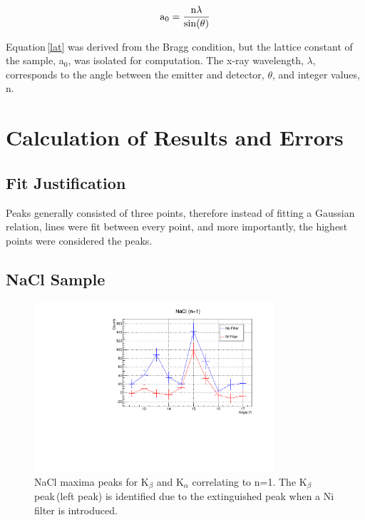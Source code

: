 \documentclass[aps,prl,twocolumn,superscriptaddress,nofootinbib]{revtex4-1}
\begin{document}
\begin{equation}
\textnormal{a$_0$}=\frac{\textnormal{n}\lambda}{\sin(\theta)}
\label{lat}
\end{equation}
 
Equation\,\ref{lat} was derived from the Bragg condition, but the lattice constant of the sample, a$_0$, was isolated for computation. The x-ray wavelength, $\lambda$, corresponds to the angle between the emitter and detector, $\theta$, and integer values, n.




\section{Calculation of Results and Errors}
\subsection{Fit Justification}
Peaks generally consisted of three points, therefore instead of fitting a Gaussian relation, lines were fit between every point, and more importantly, the highest points were considered the peaks. 

\subsection{NaCl Sample}

\begin{figure}[h!]
  \begin{center}
\centerline{\includegraphics[width=3.5in]{nacl1.pdf}}
\caption{ \small{NaCl maxima peaks for K$_\beta$ and K$_\alpha$ correlating to n=1. The K$_\beta$ peak\,(left peak) is identified due to the extinguished peak when a Ni filter is introduced. \label{nacl1}}}
  \end{center}
\end{figure}
\end{document}
